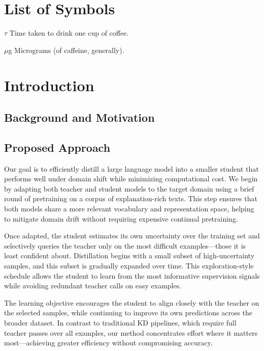 \documentclass[draft]{uiucthesis2021}
\begin{document}
\chapter{List of Symbols}

\begin{symbollist}[0.7in]
\item[$\tau$] Time taken to drink one cup of coffee.
\item[$\mu$g] Micrograms (of caffeine, generally).
\end{symbollist}

\mainmatter

\chapter{Introduction}

\section{Background and Motivation}






\section{Proposed Approach}
Our goal is to efficiently distill a large language model into a smaller student that performs well under domain shift while minimizing computational cost. We begin by adapting both teacher and student models to the target domain using a brief round of pretraining on a corpus of explanation-rich texts. This step ensures that both models share a more relevant vocabulary and representation space, helping to mitigate domain drift without requiring expensive continual pretraining.

Once adapted, the student estimates its own uncertainty over the training set and selectively queries the teacher only on the most difficult examples—those it is least confident about. Distillation begins with a small subset of high-uncertainty samples, and this subset is gradually expanded over time. This exploration-style schedule allows the student to learn from the most informative supervision signals while avoiding redundant teacher calls on easy examples.

The learning objective encourages the student to align closely with the teacher on the selected samples, while continuing to improve its own predictions across the broader dataset. In contrast to traditional KD pipelines, which require full teacher passes over all examples, our method concentrates effort where it matters most—achieving greater efficiency without compromising accuracy.
\end{document}
